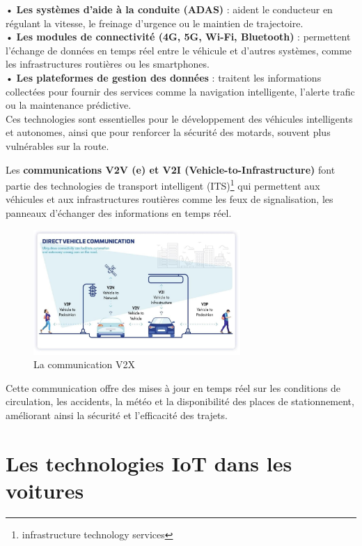 \documentclass{article}
\begin{document}
• \textbf{Les systèmes d’aide à la conduite (ADAS)} : aident le conducteur en régulant la vitesse, le freinage d’urgence ou le maintien de trajectoire.\\
• \textbf{Les modules de connectivité (4G, 5G, Wi-Fi, Bluetooth)} : permettent l’échange de données en temps réel entre le véhicule et d’autres systèmes, comme les infrastructures routières ou les smartphones.\\
• \textbf{Les plateformes de gestion des données} : traitent les informations collectées pour fournir des services comme la navigation intelligente, l’alerte trafic ou la maintenance prédictive.\\
Ces technologies sont essentielles pour le développement des véhicules intelligents et autonomes, ainsi que pour renforcer la sécurité des motards, souvent plus vulnérables sur la route.\\
\vspace{0.5cm}

Les \textbf{communications V2V (e) et V2I (Vehicle-to-Infrastructure)} font partie des technologies de transport intelligent (ITS)\footnote{infrastructure technology services} qui permettent aux véhicules et aux infrastructures routières comme les feux de signalisation, les panneaux d’échanger des informations en temps réel.

\begin{figure}[H]
    \centering
    \includegraphics[width=0.7\textwidth]{images/schema_v2.png} 
    \caption{La communication V2X}
\end{figure}

Cette communication offre des mises à jour en temps réel sur les conditions de circulation, les accidents, la météo et la disponibilité des places de stationnement, améliorant ainsi la sécurité et l’efficacité des trajets\cite{joberty_blog}.\\



\newpage
\section{Les technologies IoT dans les voitures}
\end{document}
